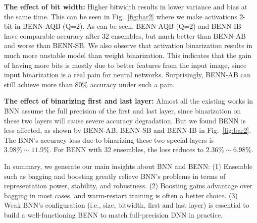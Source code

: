 \documentclass[10pt,twocolumn,letterpaper]{article}
\begin{document}
\textbf{The effect of bit width: } Higher bitwidth results in lower variance and bias at the same time. This can be seen in Fig.~\ref{fig:bar2} where we make activations 2-bit in BENN-AQB (Q=2). As can be seen, BENN-AQB (Q=2) and BENN-IB have comparable accuracy after 32 ensembles, but much better than BENN-AB and worse than BENN-SB. We also observe that activation binarization results in much more unstable model than weight binarization. This indicates that the gain of having more bits is mostly due to better features from the input image, since input binarization is a real pain for neural networks. Surprisingly, BENN-AB can still achieve more than $80\%$ accuracy under such a pain.

\textbf{The effect of binarizing first and last layer: } Almost all the existing works in BNN assume the full precision of the first and last layer, since binarization on these two layers will cause severe accuracy degradation. But we found BENN is less affected, as shown by BENN-AB, BENN-SB and BENN-IB in Fig.~\ref{fig:bar2}. The BNN's accuracy loss due to binarizing these two special layers is $3.98\% \sim 11.9\%$. For BENN with 32 ensembles, the loss reduces to $2.36\% \sim 6.98\%$.

In summary, we generate our main insights about BNN and BENN: (1) Ensemble such as bagging and boosting greatly relieve BNN's problems in terms of representation power, stability, and robustness. (2) Boosting gains advantage over bagging in most cases, and warm-restart training is often a better choice. (3) Weak BNN's configuration (i.e., size, bitwidth, first and last layer) is essential to build a well-functioning BENN to match full-precision DNN in practice.
\end{document}
